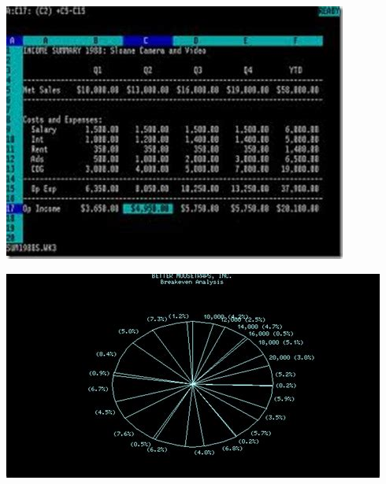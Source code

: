 	\vfill
\pagebreak

\begin{center}
	\includegraphics[height=\textheight]{./IMG/th-1741626982.jpg}
\end{center}

\vfill
\pagebreak

	\begin{center}
		\includegraphics[height=\textheight]{./IMG/th-3913457146.jpg}
	\end{center}
	
\vfill
\pagebreak

